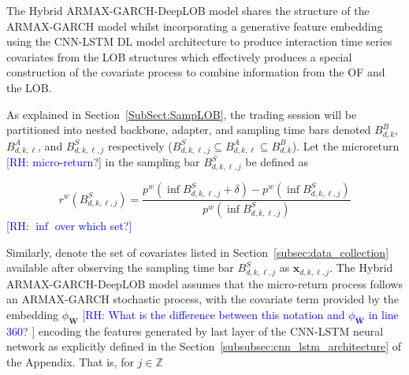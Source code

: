 \documentclass[10pt,a4paper,oneside]{article}
\newcommand{\Z}{\mathbb{Z}}
\newcommand{\rh}[1]{\textcolor{blue}{\textsf{[RH: #1]}}}
\begin{document}
The Hybrid ARMAX-GARCH-DeepLOB model shares the structure of the ARMAX-GARCH model whilst incorporating a generative feature embedding using the CNN-LSTM DL model architecture to produce interaction time series covariates from the LOB structures which effectively produces a special construction of the covariate process to combine information from the OF and the LOB.

As explained in Section~\ref{SubSect:SampLOB}, the trading session will be partitioned into nested backbone, adapter, and sampling time bars denoted $B^B_{d,k}$, $B^A_{d,k,\ell}$, and $B^S_{d,k,\ell,j}$ respectively ($B^S_{d,k,\ell,j} \subseteq B^A_{d,k,\ell} \subseteq B^B_{d,k}$). Let the microreturn \rh{micro-return?} in the sampling bar $B^S_{d, k, \ell, j}$ be defined as

$$
    r^w\left( B^S_{d, k, \ell, j} \right) = \frac{p^w\left( \inf B^S_{d, k, \ell, j} + \delta \right) - p^w\left( \inf B^S_{d, k, \ell, j}\right)}{p^w\left( \inf B^S_{d, k, \ell, j}\right)}
$$
\rh{$\inf$ over which set?}

Similarly, denote the set of covariates listed in Section~\ref{subsec:data_collection} available after observing the sampling time bar $B^S_{d, k, \ell, j}$ as $\mathbf{x}_{d, k, \ell, j}$. The Hybrid ARMAX-GARCH-DeepLOB model assumes that the micro-return process follows an ARMAX-GARCH stochastic process, with the covariate term provided by the embedding $\phi_{\mathbf{W}}$ \rh{What is the difference  between this notation and $\phi_{\hat{\mathbf{W}}}$ in line 360? }
encoding the features generated by last layer of the CNN-LSTM neural network as explicitly defined in the Section~\ref{subsubsec:cnn_lstm_architecture} of the Appendix. That is, for $j \in \Z$
\end{document}
